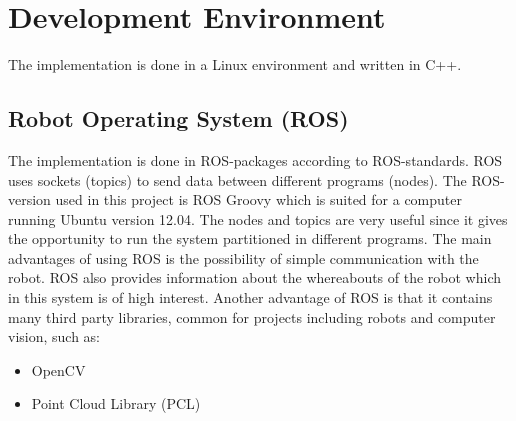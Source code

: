 
\section{Development Environment}
The implementation is done in a Linux environment and written in C++.

\subsection{Robot Operating System (ROS)}
The implementation is done in ROS-packages according to ROS-standards. ROS \cite{ROS}
uses sockets (topics) to send data between different programs (nodes). The ROS-version used in this project is ROS Groovy which is suited for a computer running Ubuntu version 12.04. The nodes and topics are very useful since it gives the opportunity to run the system partitioned in different programs. The main advantages of using ROS is the possibility of simple communication with the robot. ROS also provides information about the whereabouts of the robot which in this system is of high interest. Another advantage of ROS is that it contains many third party libraries, common for projects including robots and computer vision, such as: 

\begin{itemize}
\item OpenCV
\item Point Cloud Library (PCL)
\end{itemize}
